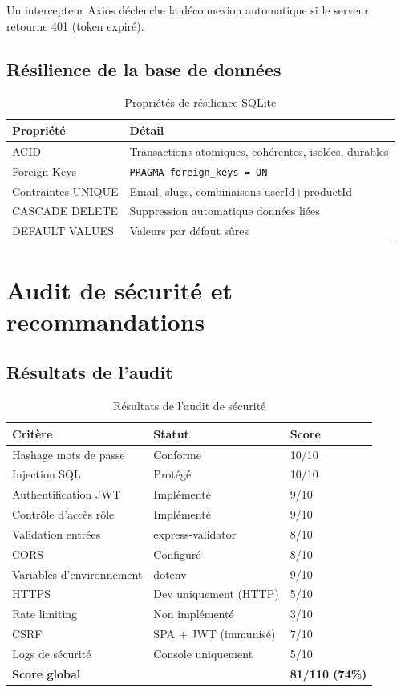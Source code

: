 Un intercepteur Axios déclenche la déconnexion automatique si le serveur retourne 401 (token expiré).

\subsection{Résilience de la base de données}

\begin{table}[H]
\centering
\caption{Propriétés de résilience SQLite}
\label{tab:resilience}
\begin{tabular}{|l|l|}
\hline
\textbf{Propriété} & \textbf{Détail} \\
\hline
ACID & Transactions atomiques, cohérentes, isolées, durables \\
\hline
Foreign Keys & \texttt{PRAGMA foreign\_keys = ON} \\
\hline
Contraintes UNIQUE & Email, slugs, combinaisons userId+productId \\
\hline
CASCADE DELETE & Suppression automatique données liées \\
\hline
DEFAULT VALUES & Valeurs par défaut sûres \\
\hline
\end{tabular}
\end{table}

\section{Audit de sécurité et recommandations}

\subsection{Résultats de l'audit}

\begin{table}[H]
\centering
\caption{Résultats de l'audit de sécurité}
\label{tab:audit}
\begin{tabular}{|l|l|l|}
\hline
\textbf{Critère} & \textbf{Statut} & \textbf{Score} \\
\hline
Hashage mots de passe & Conforme & 10/10 \\
\hline
Injection SQL & Protégé & 10/10 \\
\hline
Authentification JWT & Implémenté & 9/10 \\
\hline
Contrôle d'accès rôle & Implémenté & 9/10 \\
\hline
Validation entrées & express-validator & 8/10 \\
\hline
CORS & Configuré & 8/10 \\
\hline
Variables d'environnement & dotenv & 9/10 \\
\hline
HTTPS & Dev uniquement (HTTP) & 5/10 \\
\hline
Rate limiting & Non implémenté & 3/10 \\
\hline
CSRF & SPA + JWT (immunisé) & 7/10 \\
\hline
Logs de sécurité & Console uniquement & 5/10 \\
\hline
\textbf{Score global} & & \textbf{81/110 (74\%)} \\
\hline
\end{tabular}
\end{table}

